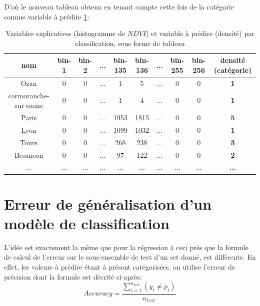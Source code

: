 \documentclass{book}
\begin{document}
D'où le nouveau tableau obtenu en tenant compte cette fois de la catégorie comme variable à prédire \ref{data_class}:\\
\begin{table}[H]
\begin{center}
\begin{adjustbox}{max width=\textwidth}
\begin{tabular}{|c|c|c|c|c|c|c|c|c|>{\bfseries}c|}
\hline 
nom &  bin-1 & bin-2 & ... & bin-135 & bin-136 &... & bin-255 & bin-256 & densité (catégorie) \\
\hline 
Ozan & 0 & 0 & ... & 1 & 5 & ... & 0 & 0 & 1\\
\hline 
cormoranche-sur-saone & 0 & 0 & ... & 1 & 4 & ... & 0 & 0 & 1\\
\hline 
Paris & 0 & 0 & ... & 1953 & 1815 & ... & 0 & 0 & 5\\
\hline
Lyon & 0 & 0 & ... & 1099 & 1032 & ... & 0 & 0 & 1\\
\hline
Tours & 0 & 0 & ... & 268 & 238 & ... & 0 & 0 & 3\\
\hline
Besancon & 0 & 0 & ... & 97 & 122 & ... & 0 & 0 & 2\\
\hline 
... & ... & ... & ... & ... & ... & ... & ... & ... & ... \\
\hline
\end{tabular}
\end{adjustbox}
\end{center}
\caption{Variables explicatives (histogramme de $NDVI$) et variable à prédire (densité) par classification, sous forme de tableau}
\label{data_class}
\end{table}

\clearpage
 
\section{Erreur de généralisation d'un modèle de classification}

L'idée est exactement la même que pour la régression à ceci près que la formule de calcul de l'erreur sur le sous-ensemble de test d'un set donné, est
différente. En effet, les valeurs à prédire étant à présent catégorisées, on utilise l'erreur de précision dont la formule est décrité ci-après:\\

\begin{equation}
Accuracy = \frac{\sum \limits_{\underset{}{i=1}}^{n_{test}} (y_i \neq p_i)}{n_{test}}
\end{equation}
\end{document}
